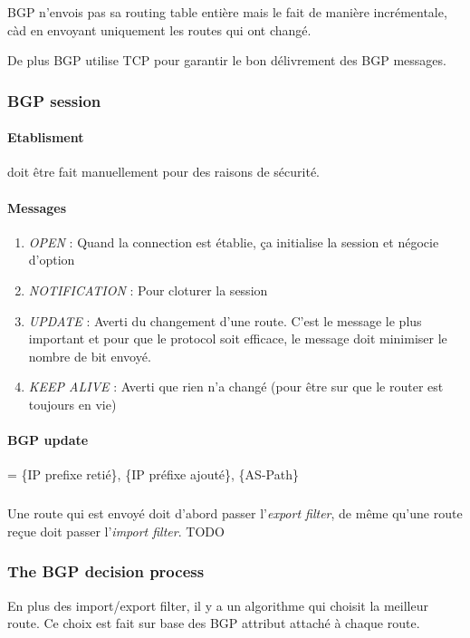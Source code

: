 \documentclass{report}
\begin{document}
BGP n'envois pas sa routing table entière mais le fait de manière incrémentale, càd en
envoyant uniquement les routes qui ont changé.

De plus BGP utilise TCP pour garantir le bon délivrement des BGP messages.

\subsubsection{BGP session}

\paragraph{Etablisment} doit être fait manuellement pour des raisons de sécurité.

\paragraph{Messages}

\begin{enumerate}
    \item \textit{OPEN} : Quand la connection est établie, ça initialise la session et
        négocie d'option
    \item \textit{NOTIFICATION} : Pour cloturer la session
    \item \textit{UPDATE} : Averti du changement d'une route. C'est le message le plus important et pour que le protocol soit efficace, le message doit minimiser le nombre de bit envoyé.
    \item \textit{KEEP ALIVE} : Averti que rien n'a changé (pour être sur que le router
        est toujours en vie)
\end{enumerate}

\paragraph{BGP update} = \{IP prefixe retié\}, \{IP préfixe ajouté\}, \{AS-Path\}

\subparagraph{ } Une route qui est envoyé doit d'abord passer l'\textit{export filter},
de même qu'une route reçue doit passer l'\textit{import filter}.
TODO

\subsubsection{The BGP decision process}
En plus des import/export filter, il y a un algorithme qui choisit la meilleur route.
Ce choix est fait sur base des BGP attribut attaché à chaque route.
\end{document}
